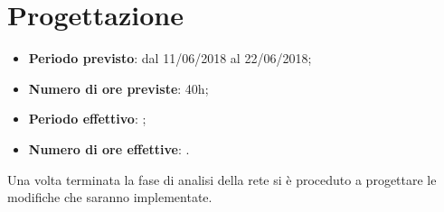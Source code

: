 \documentclass[Realizzazione.tex]{subfiles}
\begin{document}
\section{Progettazione}

\begin{itemize}
	\item \textbf{Periodo previsto}: dal 11/06/2018 al 22/06/2018;
	\item \textbf{Numero di ore previste}: 40h;
	\item \textbf{Periodo effettivo}: ;
	\item \textbf{Numero di ore effettive}: .
\end{itemize}
Una volta terminata la fase di analisi della rete si è proceduto a progettare le modifiche che saranno implementate. \\
\end{document}
